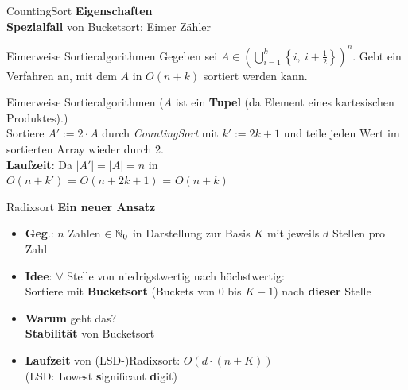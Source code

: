 \begin{frame}{CountingSort}
	\textbf{Eigenschaften}  \\
	\impl \textbf{Spezialfall} von Bucketsort: Eimer \entspr Zähler \\
	\pause
	\QuestionVspace
\end{frame}

\begin{frame}{Eimerweise Sortieralgorithmen}
	Gegeben sei $ A \in \left( \bigcup\limits_{i=1}^{k} \left\lbrace i,\ i+\frac{1}{2} \right\rbrace\right)^{\!n}$. Gebt ein Verfahren an, mit dem $A$ in $O(n + k)$ sortiert werden kann. 
\end{frame}

\begin{frame}{Eimerweise Sortieralgorithmen}
	\solutionheading
	($A$ ist ein \textbf{Tupel} (da Element eines kartesischen Produktes).) \\
	Sortiere $A' := 2 \cdot A$ durch \emph{CountingSort} mit $k' := 2k+1$ und teile jeden Wert im sortierten Array wieder durch 2. \\
	\textbf{Laufzeit}: Da $|A'| = |A| = n$ in \\ 
	$O(n + k')$ = $O(n + 2k+1)$ = $O(n + k)$ 
\end{frame}



\begin{frame}{Radixsort}
	\textbf{Ein neuer Ansatz} \\
	\begin{itemize}
		\item \textbf{Geg}.: $n$ Zahlen $\in \mathbb{N}_0$  in Darstellung zur Basis $K$ mit jeweils $d$ Stellen pro Zahl 
		\pause
		\item \textbf{Idee}: $\forall $ Stelle von niedrigstwertig nach höchstwertig: \\ Sortiere mit \textbf{Bucketsort} (Buckets von $0$ bis $K-1$) nach \textbf{dieser} Stelle
		\pause
		\item \textbf{Warum} geht das? \\
		\pause 
		\impl \textbf{Stabilität} von Bucketsort
		\item \textbf{Laufzeit} von (LSD-)Radixsort: $O(d \cdot (n + K))$ \\
		{\small (LSD: \textbf{L}owest \textbf{s}ignificant \textbf{d}igit)}
	\end{itemize}
\end{frame}


